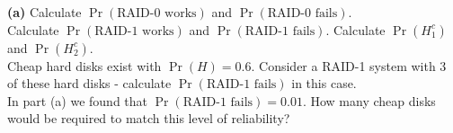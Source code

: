 \documentclass[]{article}
\begin{document}
{\bf(a)} Calculate $\Pr(\text{RAID-0 works})$ and $\Pr(\text{RAID-0 fails})$. \\[0.3cm]  Calculate $\Pr(\text{RAID-1 works})$ and $\Pr(\text{RAID-1 fails})$.  Calculate $\Pr(H_1^c)$ and $\Pr(H_2^c)$. \\[0.3cm]
 Cheap hard disks exist with $\Pr(H) = 0.6$. Consider a RAID-1 system with 3 of these hard disks - calculate $\Pr(\text{RAID-1 fails})$ in this case. \\[0.3cm]  In part (a) we found that $\Pr(\text{RAID-1 fails}) = 0.01$. How many cheap disks would be required to match this level of reliability?
\end{document}
